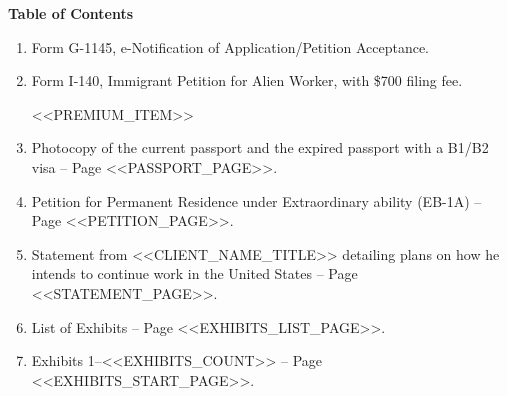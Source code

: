 \documentclass[12pt,letterpaper]{article}
\newcommand{\clientnametitle}{<<CLIENT_NAME_TITLE>>}
\newcommand{\passportpage}{<<PASSPORT_PAGE>>}
\newcommand{\petitionpage}{<<PETITION_PAGE>>}
\newcommand{\statementpage}{<<STATEMENT_PAGE>>}
\newcommand{\exhibitslistpage}{<<EXHIBITS_LIST_PAGE>>}
\newcommand{\exhibitsstartpage}{<<EXHIBITS_START_PAGE>>}
\newcommand{\exhibitscount}{<<EXHIBITS_COUNT>>}
\begin{document}
\begin{center}
\Large\textbf{Table of Contents}
\end{center}

\vspace{1em}

\begin{enumerate}[leftmargin=2em, labelsep=0.5em]
    \item Form G-1145, e-Notification of Application/Petition Acceptance.

    \item Form I-140, Immigrant Petition for Alien Worker, with \$700 filing fee.

    <<PREMIUM_ITEM>>

    \item Photocopy of the current passport and the expired passport with a B1/B2 visa -- Page \passportpage.

    \item Petition for Permanent Residence under Extraordinary ability (EB-1A) -- Page \petitionpage.

    \item Statement from \clientnametitle{} detailing plans on how he intends to continue work in the United States -- Page \statementpage.

    \item List of Exhibits -- Page \exhibitslistpage.

    \item Exhibits 1--\exhibitscount{} -- Page \exhibitsstartpage.
\end{enumerate}
\end{document}
